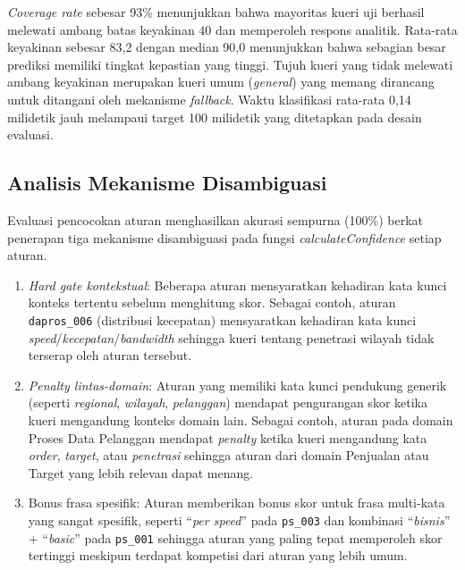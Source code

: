 \textit{Coverage rate} sebesar 93\% menunjukkan bahwa mayoritas kueri uji berhasil melewati ambang batas keyakinan 40 dan memperoleh respons analitik. Rata-rata keyakinan sebesar 83{,}2 dengan median 90{,}0 menunjukkan bahwa sebagian besar prediksi memiliki tingkat kepastian yang tinggi. Tujuh kueri yang tidak melewati ambang keyakinan merupakan kueri umum (\textit{general}) yang memang dirancang untuk ditangani oleh mekanisme \textit{fallback}. Waktu klasifikasi rata-rata 0{,}14 milidetik jauh melampaui target 100 milidetik yang ditetapkan pada desain evaluasi.

\subsection{Analisis Mekanisme Disambiguasi}

Evaluasi pencocokan aturan menghasilkan akurasi sempurna (100\%) berkat penerapan tiga mekanisme disambiguasi pada fungsi \textit{calculateConfidence} setiap aturan.

\begin{enumerate}
    \item \textit{Hard gate kontekstual}: Beberapa aturan mensyaratkan kehadiran kata kunci konteks tertentu sebelum menghitung skor. Sebagai contoh, aturan \texttt{dapros\_006} (distribusi kecepatan) mensyaratkan kehadiran kata kunci \textit{speed}\allowbreak/\allowbreak\textit{kecepatan}\allowbreak/\allowbreak\textit{bandwidth} sehingga kueri tentang penetrasi wilayah tidak terserap oleh aturan tersebut.

    \item \textit{Penalty lintas-domain}: Aturan yang memiliki kata kunci pendukung generik (seperti \textit{regional}, \textit{wilayah}, \textit{pelanggan}) mendapat pengurangan skor ketika kueri mengandung konteks domain lain. Sebagai contoh, aturan pada domain Proses Data Pelanggan mendapat \textit{penalty} ketika kueri mengandung kata \textit{order}, \allowbreak\textit{target}, \allowbreak atau \textit{penetrasi} sehingga aturan dari domain Penjualan atau Target yang lebih relevan dapat menang.

    \item Bonus frasa spesifik: Aturan memberikan bonus skor untuk frasa multi-kata yang sangat spesifik, seperti ``\textit{per speed}'' pada \texttt{ps\_003} dan kombinasi ``\textit{bisnis}'' + ``\textit{basic}'' pada \texttt{ps\_001} sehingga aturan yang paling tepat memperoleh skor tertinggi meskipun terdapat kompetisi dari aturan yang lebih umum.
\end{enumerate}

